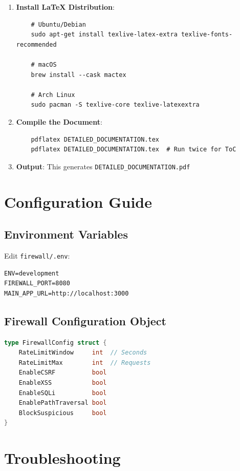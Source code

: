 \documentclass[11pt,a4paper]{report}
\begin{document}
\begin{enumerate}
    \item \textbf{Install LaTeX Distribution}:
    \begin{verbatim}
    # Ubuntu/Debian
    sudo apt-get install texlive-latex-extra texlive-fonts-recommended
    
    # macOS
    brew install --cask mactex
    
    # Arch Linux
    sudo pacman -S texlive-core texlive-latexextra
    \end{verbatim}
    
    \item \textbf{Compile the Document}:
    \begin{verbatim}
    pdflatex DETAILED_DOCUMENTATION.tex
    pdflatex DETAILED_DOCUMENTATION.tex  # Run twice for ToC
    \end{verbatim}
    
    \item \textbf{Output}: This generates \texttt{DETAILED\_DOCUMENTATION.pdf}
\end{enumerate}

\chapter{Configuration Guide}

\section{Environment Variables}
Edit \texttt{firewall/.env}:
\begin{verbatim}
ENV=development
FIREWALL_PORT=8080
MAIN_APP_URL=http://localhost:3000
\end{verbatim}

\section{Firewall Configuration Object}
\begin{lstlisting}[language=Go, caption=FirewallConfig Struct]
type FirewallConfig struct {
    RateLimitWindow     int  // Seconds
    RateLimitMax        int  // Requests
    EnableCSRF          bool
    EnableXSS           bool
    EnableSQLi          bool
    EnablePathTraversal bool
    BlockSuspicious     bool
}
\end{lstlisting}

\chapter{Troubleshooting}
\end{document}
